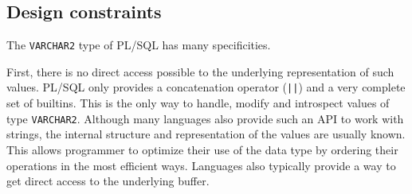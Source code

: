 \documentclass[twoside,11pt,a4paper]{article}
\newcommand{\pls}[1]{\small\texttt{#1}\normalsize}
\newcommand{\plstype}[1]{\pls{#1}}
\newcommand{\varchar}{\plstype{VARCHAR2}}
\begin{document}

\subsection{Design constraints}


The \varchar{} type of PL/SQL has many specificities.

First, there is no direct access possible to the underlying representation of such values. PL/SQL only provides a concatenation operator (\pls{||}) and a very complete set of builtins. This is the only way to handle, modify and introspect values of type \varchar{}. Although many languages also provide such an API to work with strings, the internal structure and representation of the values are usually known. This allows programmer to optimize their use of the data type by ordering their operations in the most efficient ways. Languages also typically provide a way to get direct access to the underlying buffer.
\end{document}
